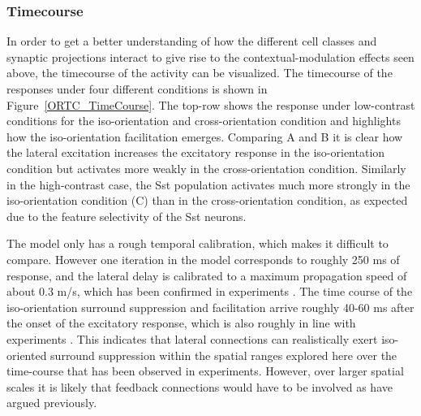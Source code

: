 \subsubsection*{Timecourse}

In order to get a better understanding of how the different cell
classes and synaptic projections interact to give rise to the
contextual-modulation effects seen above, the timecourse of the
activity can be visualized. The timecourse of the responses under four
different conditions is shown in Figure~\ref{ORTC_TimeCourse}. The
top-row shows the response under low-contrast conditions for the
iso-orientation and cross-orientation condition and highlights how the
iso-orientation facilitation emerges. Comparing A and B it is clear 
how the lateral excitation increases the excitatory response in
the iso-orientation condition but activates more weakly in the
cross-orientation condition. Similarly in the high-contrast case, the
Sst population activates much more strongly in the iso-orientation
condition (C) than in the cross-orientation condition, as expected due
to the feature selectivity of the Sst neurons.

The model only has a rough temporal calibration, which makes it
difficult to compare. However one iteration in the model corresponds
to roughly 250 ms of response, and the lateral delay is calibrated to
a maximum propagation speed of about 0.3 m/s, which has been confirmed
in experiments \citep{Hirsch1991}. The time course of the
iso-orientation surround suppression and facilitation arrive roughly
40-60 ms after the onset of the excitatory response, which is also
roughly in line with experiments \citep{Hupe2001, Bair2003}. This
indicates that lateral connections can realistically exert
iso-oriented surround suppression within the spatial ranges explored
here over the time-course that has been observed in
experiments. However, over larger spatial scales it is likely that
feedback connections would have to be involved as \cite{Bair2003} have
argued previously.

